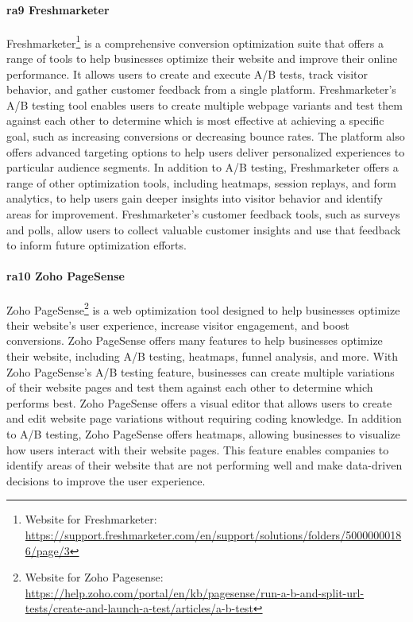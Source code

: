 \paragraph{\ac{ra}9 Freshmarketer}
Freshmarketer\footnote{Website for Freshmarketer: \url{https://support.freshmarketer.com/en/support/solutions/folders/50000000186/page/3}} is a comprehensive conversion optimization suite that offers a range of tools to help businesses optimize their website and improve their online performance. 
It allows users to create and execute A/B tests, track visitor behavior, and gather customer feedback from a single platform. 
Freshmarketer's A/B testing tool enables users to create multiple webpage variants and test them against each other to determine which is most effective at achieving a specific goal, such as increasing conversions or decreasing bounce rates. 
The platform also offers advanced targeting options to help users deliver personalized experiences to particular audience segments.
In addition to A/B testing, Freshmarketer offers a range of other optimization tools, including heatmaps, session replays, and form analytics, to help users gain deeper insights into visitor behavior and identify areas for improvement. 
Freshmarketer's customer feedback tools, such as surveys and polls, allow users to collect valuable customer insights and use that feedback to inform future optimization efforts. 

\paragraph{\ac{ra}10 Zoho PageSense}
Zoho PageSense\footnote{Website for Zoho Pagesense: \url{https://help.zoho.com/portal/en/kb/pagesense/run-a-b-and-split-url-tests/create-and-launch-a-test/articles/a-b-test}} is a web optimization tool designed to help businesses optimize their website's user experience, increase visitor engagement, and boost conversions. 
Zoho PageSense offers many features to help businesses optimize their website, including A/B testing, heatmaps, funnel analysis, and more.
With Zoho PageSense's A/B testing feature, businesses can create multiple variations of their website pages and test them against each other to determine which performs best. 
Zoho PageSense offers a visual editor that allows users to create and edit website page variations without requiring coding knowledge.
In addition to A/B testing, Zoho PageSense offers heatmaps, allowing businesses to visualize how users interact with their website pages. 
This feature enables companies to identify areas of their website that are not performing well and make data-driven decisions to improve the user experience.

